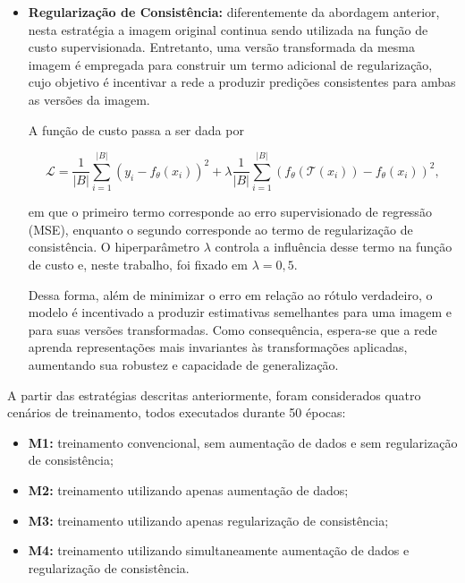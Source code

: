 \begin{itemize}
Idealmente, espera-se que, ao final do treinamento,

\begin{equation}
f_{\theta}(\mathcal{T}_1(x_i))
\approx
f_{\theta}(\mathcal{T}_2(x_i))
\approx
\cdots
\approx
f_{\theta}(\mathcal{T}_n(x_i))
\approx
f_{\theta}(x_i)
\approx
y_i,
\end{equation}

em que $\mathcal{T}_1,\ldots,\mathcal{T}_n$ representam diferentes transformações aplicadas à mesma imagem ao longo das épocas.

\item \textbf{Regularização de Consistência:} diferentemente da abordagem anterior, nesta estratégia a imagem original continua sendo utilizada na função de custo supervisionada. Entretanto, uma versão transformada da mesma imagem é empregada para construir um termo adicional de regularização, cujo objetivo é incentivar a rede a produzir predições consistentes para ambas as versões da imagem.

A função de custo passa a ser dada por

\begin{equation}
\mathcal{L}
=
\frac{1}{|B|}
\sum_{i=1}^{|B|}
\left(
y_i-f_{\theta}(x_i)
\right)^2
+
\lambda
\frac{1}{|B|}
\sum_{i=1}^{|B|}
\left(
f_{\theta}(\mathcal{T}(x_i))
-
f_{\theta}(x_i)
\right)^2,
\end{equation}

em que o primeiro termo corresponde ao erro supervisionado de regressão (MSE), enquanto o segundo corresponde ao termo de regularização de consistência. O hiperparâmetro $\lambda$ controla a influência desse termo na função de custo e, neste trabalho, foi fixado em $\lambda=0,5$.

Dessa forma, além de minimizar o erro em relação ao rótulo verdadeiro, o modelo é incentivado a produzir estimativas semelhantes para uma imagem e para suas versões transformadas. Como consequência, espera-se que a rede aprenda representações mais invariantes às transformações aplicadas, aumentando sua robustez e capacidade de generalização.
\end{itemize}

A partir das estratégias descritas anteriormente, foram considerados quatro cenários de treinamento, todos executados durante 50 épocas:

\begin{itemize}
    \item \textbf{M1:} treinamento convencional, sem aumentação de dados e sem regularização de consistência;
    \item \textbf{M2:} treinamento utilizando apenas aumentação de dados;
    \item \textbf{M3:} treinamento utilizando apenas regularização de consistência;
    \item \textbf{M4:} treinamento utilizando simultaneamente aumentação de dados e regularização de consistência.
\end{itemize}

